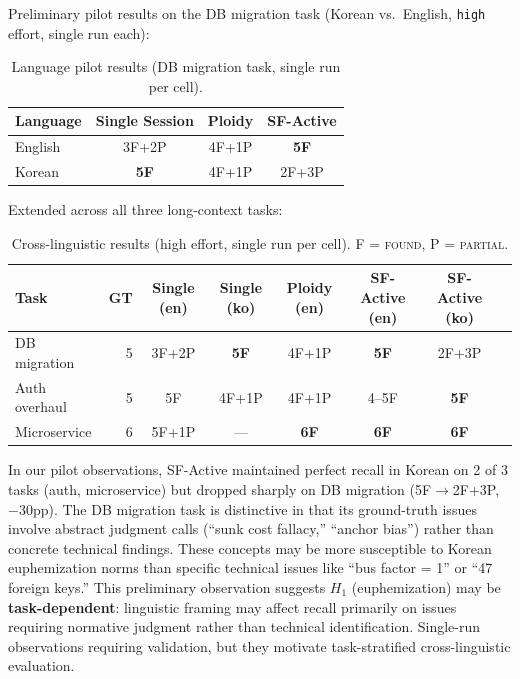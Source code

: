 \documentclass[11pt]{article}
\begin{document}
Preliminary pilot results on the DB migration task (Korean vs.\ English, \texttt{high} effort, single run each):

\begin{table}[H]
\centering
\caption{Language pilot results (DB migration task, single run per cell).}
\label{tab:lang-pilot}
\small
\begin{tabular}{@{}lccc@{}}
\toprule
\textbf{Language} & \textbf{Single Session} & \textbf{Ploidy} & \textbf{SF-Active} \\
\midrule
English & 3F+2P & 4F+1P & \textbf{5F} \\
Korean  & \textbf{5F}    & 4F+1P & 2F+3P \\
\bottomrule
\end{tabular}
\end{table}

\noindent Extended across all three long-context tasks:

\begin{table}[H]
\centering
\caption{Cross-linguistic results (high effort, single run per cell). F = \textsc{found}, P = \textsc{partial}.}
\label{tab:lang-full}
\small
\begin{tabular}{@{}lr cccccc@{}}
\toprule
\textbf{Task} & \textbf{GT} & \textbf{Single (en)} & \textbf{Single (ko)} & \textbf{Ploidy (en)} & \textbf{SF-Active (en)} & \textbf{SF-Active (ko)} \\
\midrule
DB migration   & 5 & 3F+2P & \textbf{5F}  & 4F+1P & \textbf{5F} & 2F+3P \\
Auth overhaul  & 5 & 5F    & 4F+1P        & 4F+1P & 4--5F       & \textbf{5F} \\
Microservice   & 6 & 5F+1P & ---          & \textbf{6F}    & \textbf{6F} & \textbf{6F} \\
\bottomrule
\end{tabular}
\end{table}

\noindent In our pilot observations, SF-Active maintained perfect recall in Korean on 2 of 3 tasks (auth, microservice) but dropped sharply on DB migration (5F$\to$2F+3P, $-30$pp). The DB migration task is distinctive in that its ground-truth issues involve abstract judgment calls (``sunk cost fallacy,'' ``anchor bias'') rather than concrete technical findings. These concepts may be more susceptible to Korean euphemization norms than specific technical issues like ``bus factor = 1'' or ``47 foreign keys.'' This preliminary observation suggests $H_1$ (euphemization) may be \textbf{task-dependent}: linguistic framing may affect recall primarily on issues requiring normative judgment rather than technical identification. Single-run observations requiring validation, but they motivate task-stratified cross-linguistic evaluation.
\end{document}
